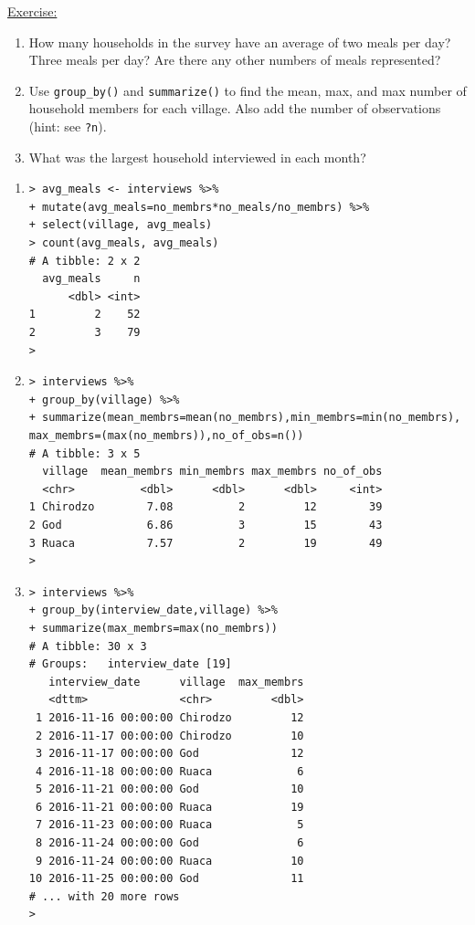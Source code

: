 \documentclass[12pt]{article}
\begin{document}
\vspace{0.5em}
\begin{addmargin}[1cm]{0cm}
\color{gray}
\underline{Exercise:}

\vspace{-1em}\begin{enumerate}
    \item How many households in the survey have an average of two meals per day? Three meals per day? Are there any other numbers of meals represented?
    \item Use \texttt{group\_by()} and \texttt{summarize()} to find the mean, max, and max number of household members for each village. Also add the number of observations (hint: see \texttt{?n}).
    \item What was the largest household interviewed in each month?
\end{enumerate}

\vspace{-1em}\color{black}
\begin{enumerate}
    \item \begin{verbatim}
> avg_meals <- interviews %>% 
+ mutate(avg_meals=no_membrs*no_meals/no_membrs) %>% 
+ select(village, avg_meals)
> count(avg_meals, avg_meals)
# A tibble: 2 x 2
  avg_meals     n
      <dbl> <int>
1         2    52
2         3    79
> 
\end{verbatim}
    \item 
\begin{verbatim}
> interviews %>% 
+ group_by(village) %>% 
+ summarize(mean_membrs=mean(no_membrs),min_membrs=min(no_membrs),
max_membrs=(max(no_membrs)),no_of_obs=n())
# A tibble: 3 x 5
  village  mean_membrs min_membrs max_membrs no_of_obs
  <chr>          <dbl>      <dbl>      <dbl>     <int>
1 Chirodzo        7.08          2         12        39
2 God             6.86          3         15        43
3 Ruaca           7.57          2         19        49
> 
\end{verbatim}
\item 
\begin{verbatim}
> interviews %>% 
+ group_by(interview_date,village) %>% 
+ summarize(max_membrs=max(no_membrs))
# A tibble: 30 x 3
# Groups:   interview_date [19]
   interview_date      village  max_membrs
   <dttm>              <chr>         <dbl>
 1 2016-11-16 00:00:00 Chirodzo         12
 2 2016-11-17 00:00:00 Chirodzo         10
 3 2016-11-17 00:00:00 God              12
 4 2016-11-18 00:00:00 Ruaca             6
 5 2016-11-21 00:00:00 God              10
 6 2016-11-21 00:00:00 Ruaca            19
 7 2016-11-23 00:00:00 Ruaca             5
 8 2016-11-24 00:00:00 God               6
 9 2016-11-24 00:00:00 Ruaca            10
10 2016-11-25 00:00:00 God              11
# ... with 20 more rows
> 
\end{verbatim}


\end{enumerate}
\end{addmargin}
\end{document}
